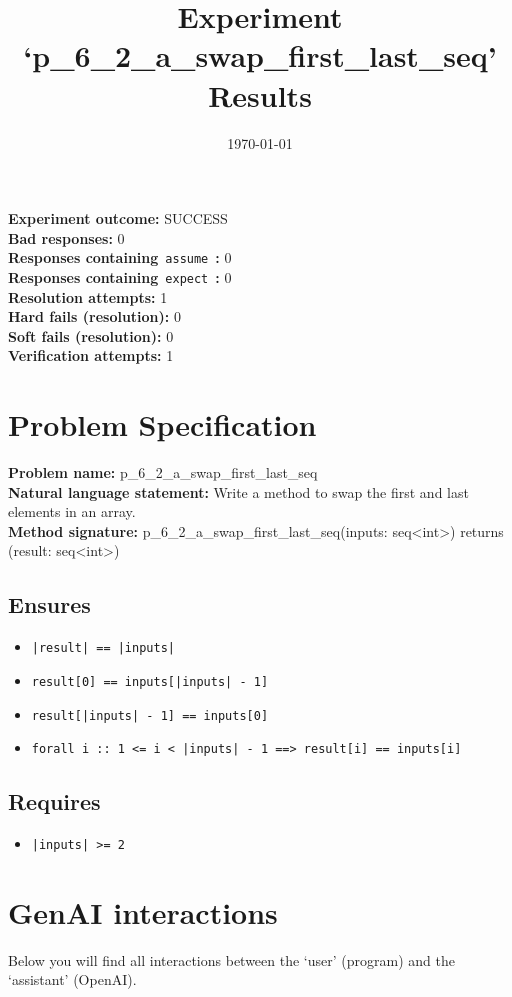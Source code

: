 \documentclass{article}
\begin{document}
\title{Experiment `p\_6\_2\_a\_swap\_first\_last\_seq' Results}
\author{\today}
\date{}
\maketitle
\textbf{Experiment outcome: }SUCCESS
\\\textbf{Bad responses: }0
\\\textbf{Responses containing}~\texttt{assume}~\textbf{: }0
\\\textbf{Responses containing}~\texttt{expect}~\textbf{: }0
\\\textbf{Resolution attempts: }1
\\\textbf{Hard fails (resolution): }0
\\\textbf{Soft fails (resolution): }0
\\\textbf{Verification attempts: }1
\section*{Problem Specification}
\textbf{Problem name: }p\_6\_2\_a\_swap\_first\_last\_seq
\\\textbf{Natural language statement: }Write a method to swap the first and last elements in an array.
\\\textbf{Method signature: }p\_6\_2\_a\_swap\_first\_last\_seq(inputs: seq<int>) returns (result: seq<int>)
\subsection*{Ensures}
\begin{itemize}
\item \texttt{|result| == |inputs|}
\item \texttt{result[0] == inputs[|inputs| - 1]}
\item \texttt{result[|inputs| - 1] == inputs[0]}
\item \texttt{forall i :: 1 <= i < |inputs| - 1 ==> result[i] == inputs[i]}
\end{itemize}
\subsection*{Requires}
\begin{itemize}
\item \texttt{|inputs| >= 2}
\end{itemize}
\clearpage
\section*{GenAI interactions}
Below you will find all interactions between the `user' (program) and the `assistant' (OpenAI).
\end{document}
